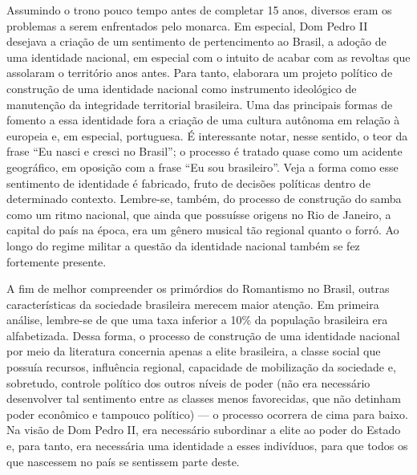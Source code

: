 \documentclass[12pt]{book}
\begin{document}
		\par Assumindo o trono pouco tempo antes de completar 15 anos, diversos eram os problemas a serem enfrentados pelo monarca. Em especial, Dom Pedro II desejava a criação de um sentimento de pertencimento ao Brasil, a adoção de uma identidade nacional, em especial com o intuito de acabar com as revoltas que assolaram o território anos antes. Para tanto, elaborara um projeto político de construção de uma identidade nacional como instrumento ideológico de manutenção da integridade territorial brasileira. Uma das principais formas de fomento a essa identidade fora a criação de uma cultura autônoma em relação à europeia e, em especial, portuguesa. É interessante notar, nesse sentido, o teor da frase ``Eu nasci e cresci no Brasil''; o processo é tratado quase como um acidente geográfico, em oposição com a frase ``Eu sou brasileiro''. Veja a forma como esse sentimento de identidade é fabricado, fruto de decisões políticas dentro de determinado contexto. Lembre-se, também, do processo de construção do samba como um ritmo nacional, que ainda que possuísse origens no Rio de Janeiro, a capital do país na época, era um gênero musical tão regional quanto o forró. Ao longo do regime militar a questão da identidade nacional também se fez fortemente presente.
		\par A fim de melhor compreender os primórdios do Romantismo no Brasil, outras características da sociedade brasileira merecem maior atenção. Em primeira análise, lembre-se de que uma taxa inferior a 10\% da população brasileira era alfabetizada. Dessa forma, o processo de construção de uma identidade nacional por meio da literatura concernia apenas a elite brasileira, a classe social que possuía recursos, influência regional, capacidade de mobilização da sociedade e, sobretudo, controle político dos outros níveis de poder (não era necessário desenvolver tal sentimento entre as classes menos favorecidas, que não detinham poder econômico e tampouco político) — o processo ocorrera de cima para baixo. Na visão de Dom Pedro II, era necessário subordinar a elite ao poder do Estado e, para tanto, era necessária uma identidade a esses indivíduos, para que todos os que nascessem no país se sentissem parte deste.
\end{document}
